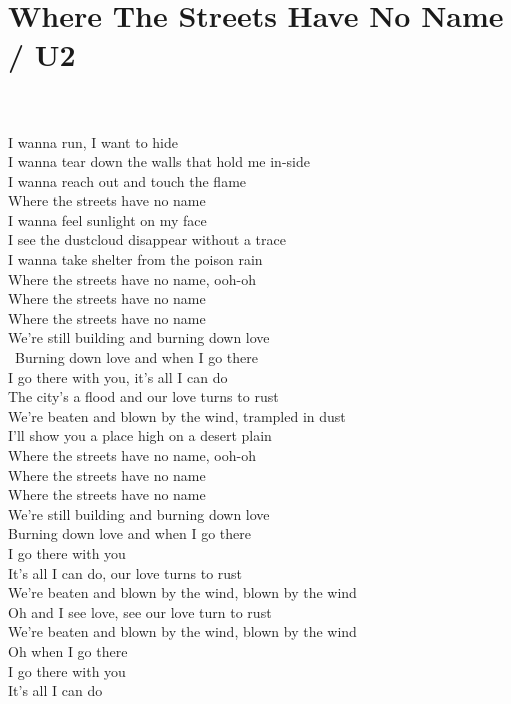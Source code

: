 \section{Where The Streets Have No Name / U2}\label{sec:wherethestreetshavenoname}

\AsusFour
\Bminor
\BminorSeven
\CaddNine
\DmajorEasy
\Gmajor

   \\
   \\
I wanna  run, I want to hide\\
I wanna tear down the walls that hold me in-side\\
I wanna reach  out and touch the  flame\\
Where the  streets have no name\\
I wanna  feel sunlight on my face\\
I see the dustcloud disappear without a  trace\\
I wanna take  shelter from the poison  rain\\
Where the  streets have no name, ooh-oh\\
Where the streets have no  name\\
Where the streets have no name\\
We're still building and  burning down love\\\
Burning down love and when I  go there\\
I go there with  you, it's all I can  do\\
The city's a \upchord{D} flood and our love turns to rust\\
We're beaten and blown by the wind, trampled  in dust\\
I'll show you a \upchord{Bm7} place high on a \upchord{Asus4} desert plain\\
Where the \upchord{Cadd9} streets have no name, ooh-oh\\
Where the streets have no  name\\
Where the streets have no name\\
We're still building and  burning down love\\
Burning down love and when I  go there\\
I go there with  you\\
It's all I can  do, our love turns to rust\\
We're beaten and  blown by the wind, blown by the wind\\
Oh and \upchord{D} I see love, see our love turn to rust\\
We're beaten and  blown by the wind, blown by the wind\\
Oh when I \upchord{Bm7} go there\\
I go there with  you\\
It's all I  can do\\
